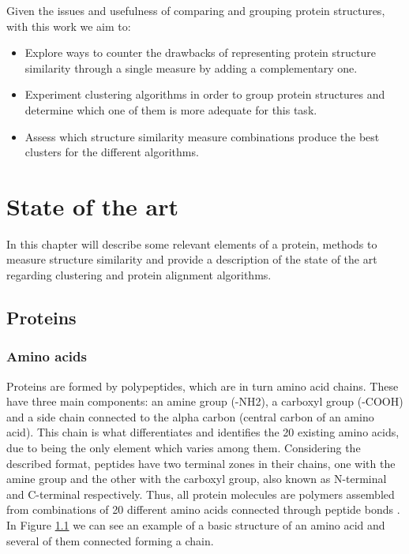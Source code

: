 Given the issues and usefulness of comparing and grouping protein structures, with this work we aim to:
\begin{itemize}
	\item Explore ways to counter the drawbacks of representing protein structure similarity through a single measure by adding a complementary one.
	\item Experiment clustering algorithms in order to group protein structures and determine which one of them is more adequate for this task.
	\item Assess which structure similarity measure combinations produce the best clusters for the different algorithms.
\end{itemize}
	
\chapter{State of the art}

In this chapter will describe some relevant elements of a protein, methods to measure structure similarity and provide a description of the state of the art regarding clustering and protein alignment algorithms. 

\section{Proteins}

\subsection{Amino acids}
Proteins are formed by polypeptides, which are in turn amino acid chains. These have three main components: an amine group (-NH2), a carboxyl group (-COOH) and a side chain connected to the alpha carbon (central carbon of an amino acid). This chain is what differentiates and identifies the 20 existing amino acids, due to being the only element which varies among them. Considering the described format, peptides have two terminal zones in their chains, one with the amine group and the other with the carboxyl group, also known as N-terminal and C-terminal respectively. Thus, all protein molecules are polymers assembled from combinations of 20 different amino acids connected through peptide bonds \cite{branden1999introduction}. In Figure \ref{fig:aminoacid} we can see an example of a basic structure of an amino acid and several of them connected forming a chain.

\begin{figure}[htbp]
	\centering
	\caption{}
	\label{fig:aminoacid}
\end{figure}

